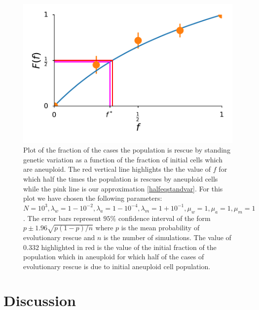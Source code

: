 \documentclass[12pt]{extarticle}
\begin{document}
\begin{figure}[!t]
 \vspace*{1\baselineskip}
\includegraphics[width=1\textwidth]{Figures/FractionPlot.pdf}
\caption{Plot of the fraction of the cases the population is rescue by standing genetic variation as a function of the fraction of initial cells which are aneuploid. The red vertical line highlights the the value of $f$ for which half the times the population is rescues by aneuploid cells while the pink line is our approximation \eqref{halfeqstandvar}. For this plot we have chosen the following parameters: $N=10^3, \lambda_w=1-10^{-2}, \lambda_a=1-10^{-4},\lambda_m=1+10^{-1},\mu_w=1,\mu_a=1,\mu_m=1$. The error bars represent $95\%$ confidence interval of the form $p\pm1.96\sqrt{p\left(1-p\right)/n}$ where $p$ is the mean probability of evolutionary rescue and $n$ is the number of simulations. The value of $0.332$ highlighted in red is the value of the initial fraction of the population which in aneuploid for which half of the cases of evolutionary rescue is due to initial aneuploid cell population.}
\label{FractionPlot}
\end{figure}


\section*{Discussion}


\nolinenumbers
%
%
%


\pagebreak
\end{document}
